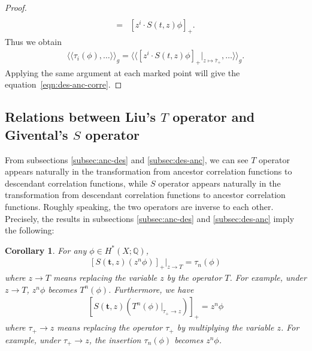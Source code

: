 \documentclass[12pt,reqno]{amsart}
\theoremstyle{plain}
\newtheorem{corollary}[theorem]{Corollary}
\theoremstyle{definition}
\theoremstyle{remark}
\begin{document}
\begin{appendix}
\begin{proof}
\begin{align*}
\\=&[z^{i}\cdot S(t,z)\phi]_{+}.
\end{align*}
Thus we obtain
\begin{align*}
\langle\langle\tau_{i}(\phi),\dots\rangle\rangle_g
=\langle\langle [z^{i}\cdot S(t,z)\phi]_{+}|_{z\mapsto \bar{\tau}_{+}},\dots\rangle\rangle_g.
\end{align*}
Applying the same argument at each marked point will give the equation~\eqref{eqn:des-anc-corre}.
\end{proof}

\subsection{Relations between Liu's $T$ operator and Givental's $S$ operator}

From subsections \ref{subsec:anc-des} and \ref{subsec:des-anc}, we can see $T$ operator appears naturally in the transformation from ancestor correlation functions to 
descendant correlation functions, while $S$ operator appears naturally in the transformation from  descendant correlation functions to 
ancestor correlation functions. Roughly speaking, the two operators are inverse to each other.
Precisely, the results in subsections \ref{subsec:anc-des} and \ref{subsec:des-anc} imply the following:
\begin{corollary}
For any $\phi\in H^*(X;\mathbb{Q})$,
\begin{align*}
\left[ S(\mathbf{t},z)(z^n\phi)\right]_{+}\bigg|_{z\rightarrow T}=\tau_n(\phi)    
\end{align*}
where $z\rightarrow T$ means replacing the variable $z$ by the operator $T$. For example,  under $z\rightarrow T$, $z^n\phi$ becomes $T^n(\phi)$.
Furthermore, we have
\begin{align*}
\left[S(\mathbf{t},z)\left(T^{n}(\phi)\big|_{\tau_+\rightarrow z}\right)\right]_{+}=z^n\phi    
\end{align*}
where $\tau_+\rightarrow z$ means replacing the operator $\tau_+$ by multiplying the variable $z$. For example, under $\tau_+\rightarrow z$, the insertion $\tau_{n}(\phi)$ becomes $z^n\phi$.
\end{corollary}
 

\end{appendix}
\end{document}
